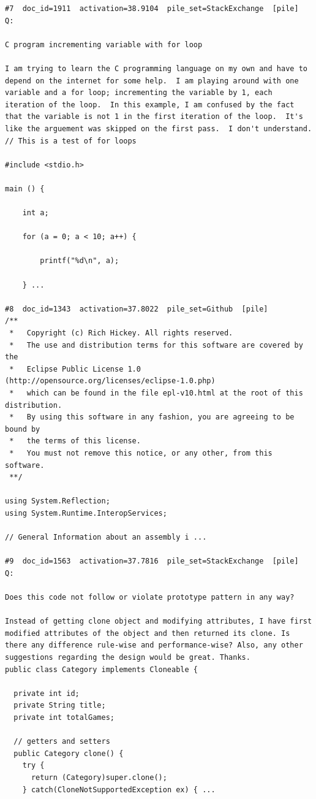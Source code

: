 \begin{verbatim}
#7  doc_id=1911  activation=38.9104  pile_set=StackExchange  [pile]
Q:

C program incrementing variable with for loop

I am trying to learn the C programming language on my own and have to depend on the internet for some help.  I am playing around with one variable and a for loop; incrementing the variable by 1, each iteration of the loop.  In this example, I am confused by the fact that the variable is not 1 in the first iteration of the loop.  It's like the arguement was skipped on the first pass.  I don't understand.
// This is a test of for loops

#include <stdio.h>

main () {

    int a;

    for (a = 0; a < 10; a++) {

        printf("%d\n", a);

    } ...

#8  doc_id=1343  activation=37.8022  pile_set=Github  [pile]
﻿/**
 *   Copyright (c) Rich Hickey. All rights reserved.
 *   The use and distribution terms for this software are covered by the
 *   Eclipse Public License 1.0 (http://opensource.org/licenses/eclipse-1.0.php)
 *   which can be found in the file epl-v10.html at the root of this distribution.
 *   By using this software in any fashion, you are agreeing to be bound by
 * 	 the terms of this license.
 *   You must not remove this notice, or any other, from this software.
 **/

using System.Reflection;
using System.Runtime.InteropServices;

// General Information about an assembly i ...

#9  doc_id=1563  activation=37.7816  pile_set=StackExchange  [pile]
Q:

Does this code not follow or violate prototype pattern in any way?

Instead of getting clone object and modifying attributes, I have first modified attributes of the object and then returned its clone. Is there any difference rule-wise and performance-wise? Also, any other suggestions regarding the design would be great. Thanks.
public class Category implements Cloneable {

  private int id;
  private String title;
  private int totalGames;

  // getters and setters
  public Category clone() {
    try {
      return (Category)super.clone();
    } catch(CloneNotSupportedException ex) { ...


\end{verbatim}
